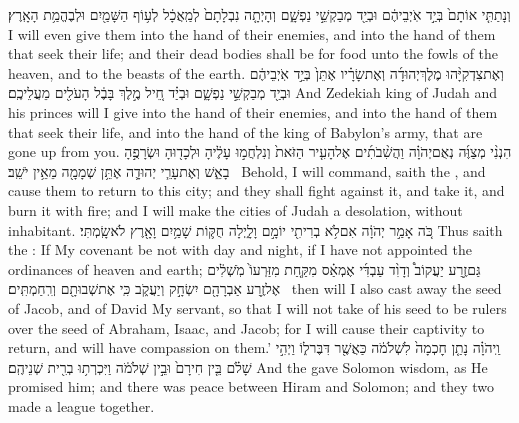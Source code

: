 {וְנָתַתִּ֤י אוֹתָם֙ בְּיַ֣ד אֹֽיְבֵיהֶ֔ם וּבְיַ֖ד מְבַקְשֵׁ֣י נַפְשָׁ֑ם וְהָיְתָ֤ה נִבְלָתָם֙ לְמַֽאֲכָ֔ל לְע֥וֹף הַשָּׁמַ֖יִם וּלְבֶהֱמַ֥ת הָאָֽרֶץ׃}
{I will even give them into the hand of their enemies, and into the hand of them that seek their life; and their dead bodies shall be for food unto the fowls of the heaven, and to the beasts of the earth.}
{וְאֶת\maqqaf צִדְקִיָּ֨הוּ מֶלֶךְ\maqqaf יְהוּדָ֜ה וְאֶת\maqqaf שָׂרָ֗יו אֶתֵּן֙ בְּיַ֣ד אֹֽיְבֵיהֶ֔ם וּבְיַ֖ד מְבַקְשֵׁ֣י נַפְשָׁ֑ם וּבְיַ֗ד חֵ֚יל מֶ֣לֶךְ בָּבֶ֔ל הָעֹלִ֖ים מֵעֲלֵיכֶֽם׃}
{And Zedekiah king of Judah and his princes will I give into the hand of their enemies, and into the hand of them that seek their life, and into the hand of the king of Babylon’s army, that are gone up from you.}
{הִנְנִ֨י מְצַוֶּ֜ה נְאֻם\maqqaf יְהֹוָ֗ה וַהֲשִׁ֨בֹתִ֜ים אֶל\maqqaf הָעִ֤יר הַזֹּאת֙ וְנִלְחֲמ֣וּ עָלֶ֔יהָ וּלְכָד֖וּהָ וּשְׂרָפֻ֣הָ בָאֵ֑שׁ וְאֶת\maqqaf עָרֵ֧י יְהוּדָ֛ה אֶתֵּ֥ן שְׁמָמָ֖ה מֵאֵ֥ין יֹשֵֽׁב׃ \petucha }
{Behold, I will command, saith the \lord, and cause them to return to this city; and they shall fight against it, and take it, and burn it with fire; and I will make the cities of Judah a desolation, without inhabitant.}
\setcounter{chap}{33}
\setcounter{verse}{25}
{כֹּ֚ה אָמַ֣ר יְהֹוָ֔ה אִם\maqqaf לֹ֥א בְרִיתִ֖י יוֹמָ֣ם וָלָ֑יְלָה חֻקּ֛וֹת שָׁמַ֥יִם וָאָ֖רֶץ לֹא\maqqaf שָֽׂמְתִּי׃}
{Thus saith the \lord: If My covenant be not with day and night, if I have not appointed the ordinances of heaven and earth;}
{גַּם\maqqaf זֶ֣רַע יַעֲקוֹב֩ וְדָוִ֨ד עַבְדִּ֜י אֶמְאַ֗ס מִקַּ֤חַת מִזַּרְעוֹ֙ מֹֽשְׁלִ֔ים אֶל\maqqaf זֶ֥רַע אַבְרָהָ֖ם יִשְׂחָ֣ק וְיַעֲקֹ֑ב כִּֽי\maqqaf {} אֶת\maqqaf שְׁבוּתָ֖ם וְרִֽחַמְתִּֽים׃ \petucha }
{then will I also cast away the seed of Jacob, and of David My servant, so that I will not take of his seed to be rulers over the seed of Abraham, Isaac, and Jacob; for I will cause their captivity to return, and will have compassion on them.’}
\label{haft_19}
\setcounter{chap}{5}
\setcounter{verse}{26}
{וַֽיהֹוָ֗ה נָתַ֤ן חׇכְמָה֙ לִשְׁלֹמֹ֔ה כַּאֲשֶׁ֖ר דִּבֶּר\maqqaf ל֑וֹ וַיְהִ֣י שָׁלֹ֗ם בֵּ֤ין חִירָם֙ וּבֵ֣ין שְׁלֹמֹ֔ה וַיִּכְרְת֥וּ בְרִ֖ית שְׁנֵיהֶֽם׃}
{And the \lord\space gave Solomon wisdom, as He promised him; and there was peace between Hiram and Solomon; and they two made a league together.}
